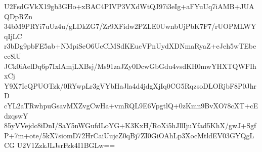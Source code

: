 U2FsdGVkX19gb3GHo+xBAC4PIVP3VXdWtQJ97i3eIg+aFYuUq7iAMB+JUAQDpRZn
34bM9PRYi7uUz4u/gLDkZG7/Zr9XFidw2PZLE0UwnbUjPbK7F7/rUOPMLWYqIjLC
r3bDg9pbFE5ab+NMpiSeO6UcClMSdKEucVPnUydXDNmaRyaZ+eJeh5wTEbecc8lU
JCk0iAelDq6p7IxlAmjLXBsj/Ms91zaJZy0DcwGbGdu4vsdKH0mwYHXTQWFIhxCj
Y9X7IeQPUOTzk/0RYwpLr3gVYbHaJla4d4jdgXjIq0CG5RqzsoDLORjbF8P0JhrD
cYL2aTRwhpuGsavMXZvgCwHa+vmRQL9E6VpgtlQ+0zKmn9BvXO78cXT+cEdzqswY
85yVVejdc8iDnI/SaY5nWGufdLoYG+K3KxH/RoXi5hJllIjuYfad5KhX/gwJ+Sgf
P+7m+ote/5kX7siomD72HrCaiUujcZ0qBj7ZI0GiOAhLp3XocMtldEV03GYQgLCG
U2V1ZzkJLJsrFzk4I1BGLw==
